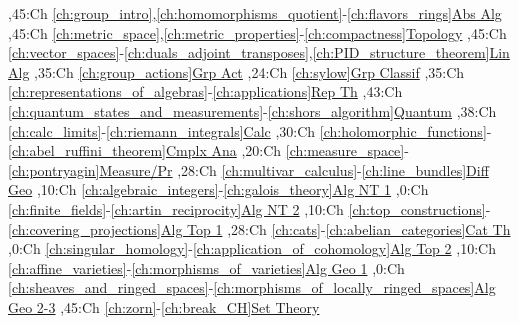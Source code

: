 
\bgroup
\renewcommand{\href}[1]{} %
\hypersetup{linkcolor=black} %
\renewcommand{\solidwidth}{0.7pt}
\renewcommand{\boldwidth}{1.5pt}

\setcounter{diagheight}{50}
\begin{chart}
,45:{Ch \ref*{ch:group_intro},\ref*{ch:homomorphisms_quotient}-\ref*{ch:flavors_rings}}{\hyperref[part:absalg]{Abs Alg}}{}
,45:{Ch \ref*{ch:metric_space},\ref*{ch:metric_properties}-\ref*{ch:compactness}}{\hyperref[part:basictop]{Topology}}{}
,45:{Ch \ref*{ch:vector_spaces}-\ref*{ch:duals_adjoint_transposes},\ref*{ch:PID_structure_theorem}}{\hyperref[part:linalg]{Lin Alg}}{}
,35:{Ch \ref*{ch:group_actions}}{\hyperref[part:groups]{Grp Act}}{}
,24:{Ch \ref*{ch:sylow}}{\hyperref[ch:sylow]{Grp Classif}}{}
,35:{Ch \ref*{ch:representations_of_algebras}-\ref*{ch:applications}}{\hyperref[part:repth]{Rep Th}}{}
,43:{Ch \ref*{ch:quantum_states_and_measurements}-\ref*{ch:shors_algorithm}}{\hyperref[part:quantum]{Quantum}}{}
,38:{Ch \ref*{ch:calc_limits}-\ref*{ch:riemann_integrals}}{\hyperref[part:calc]{Calc}}{}
,30:{Ch \ref*{ch:holomorphic_functions}-\ref*{ch:abel_ruffini_theorem}}{\hyperref[part:cmplxana]{Cmplx Ana}}{}
,20:{Ch \ref*{ch:measure_space}-\ref*{ch:pontryagin}}{\hyperref[part:measure]{Measure/Pr}}{}
,28:{Ch \ref*{ch:multivar_calculus}-\ref*{ch:line_bundles}}{\hyperref[part:diffgeo]{Diff Geo}}{}
,10:{Ch \ref*{ch:algebraic_integers}-\ref*{ch:galois_theory}}{\hyperref[part:algnt1]{Alg NT 1}}{}
,0:{Ch \ref*{ch:finite_fields}-\ref*{ch:artin_reciprocity}}{\hyperref[part:algnt2]{Alg NT 2}}{}
,10:{Ch \ref*{ch:top_constructions}-\ref*{ch:covering_projections}}{\hyperref[part:algtop1]{Alg Top 1}}{}
,28:{Ch \ref*{ch:cats}-\ref*{ch:abelian_categories}}{\hyperref[part:cats]{Cat Th}}{}
,0:{Ch \ref*{ch:singular_homology}-\ref*{ch:application_of_cohomology}}{\hyperref[part:algtop2]{Alg Top 2}}{}
,10:{Ch \ref*{ch:affine_varieties}-\ref*{ch:morphisms_of_varieties}}{\hyperref[part:ag1]{Alg Geo 1}}{}
,0:{Ch \ref*{ch:sheaves_and_ringed_spaces}-\ref*{ch:morphisms_of_locally_ringed_spaces}}{\hyperref[part:ag2]{Alg Geo 2-3}}{}
,45:{Ch \ref*{ch:zorn}-\ref*{ch:break_CH}}{\hyperref[part:st1]{Set Theory}}{}


\end{chart}
